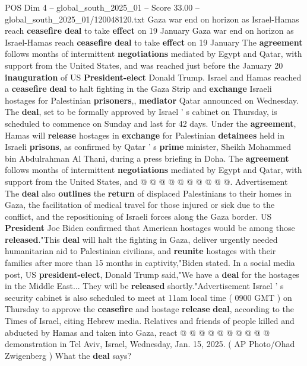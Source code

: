 \begin{textsample}{POS Dim 4 – global\_south\_2025\_01 – Score 33.00 – global\_south\_2025\_01/120048120.txt}  \label{ex:f4_pos_001}
Gaza war end on horizon as Israel-Hamas reach \textbf{ceasefire} \textbf{deal} to take \textbf{effect} on 19 January Gaza war end on horizon as Israel-Hamas reach \textbf{ceasefire} \textbf{deal} to take \textbf{effect} on 19 January The \textbf{agreement} follows months of intermittent \textbf{negotiations} mediated by Egypt and Qatar, with support from the United States, and was reached just before the January 20 \textbf{inauguration} of US \textbf{President-elect} Donald Trump.
Israel and Hamas reached a \textbf{ceasefire} \textbf{deal} to halt fighting in the Gaza Strip and \textbf{exchange} Israeli hostages for Palestinian \textbf{prisoners},, \textbf{mediator} Qatar announced on Wednesday.
The \textbf{deal}, set to be formally approved by Israel ' s cabinet on Thursday, is scheduled to commence on Sunday and last for 42 days.
Under the \textbf{agreement}, Hamas will \textbf{release} hostages in \textbf{exchange} for Palestinian \textbf{detainees} held in Israeli \textbf{prisons}, as confirmed by Qatar ' s \textbf{prime} minister, Sheikh Mohammed bin Abdulrahman Al Thani, during a press briefing in Doha.
The \textbf{agreement} follows months of intermittent \textbf{negotiations} mediated by Egypt and Qatar, with support from the United States, and @ @ @ @ @ @ @ @ @ @.
Advertisement The \textbf{deal} also \textbf{outlines} the \textbf{return} of displaced Palestinians to their homes in Gaza, the facilitation of medical travel for those injured or sick due to the conflict, and the repositioning of Israeli forces along the Gaza border.
US \textbf{President} Joe Biden confirmed that American hostages would be among those \textbf{released}."This \textbf{deal} will halt the fighting in Gaza, deliver urgently needed humanitarian aid to Palestinian civilians, and \textbf{reunite} hostages with their families after more than 15 months in captivity,"Biden stated.
In a social media post, US \textbf{president-elect}, Donald Trump said,"We have a \textbf{deal} for the hostages in the Middle East...
They will be \textbf{released} shortly."Advertisement Israel ' s security cabinet is also scheduled to meet at 11am local time ( 0900 GMT ) on Thursday to approve the \textbf{ceasefire} and hostage \textbf{release} \textbf{deal}, according to the Times of Israel, citing Hebrew media.
Relatives and friends of people killed and abducted by Hamas and taken into Gaza, react @ @ @ @ @ @ @ @ @ @ demonstration in Tel Aviv, Israel, Wednesday, Jan. 15, 2025. ( AP Photo/Ohad Zwigenberg ) What the \textbf{deal} says?

\end{textsample}
